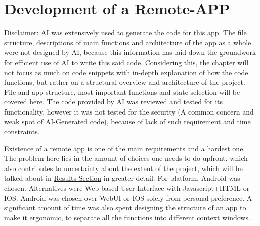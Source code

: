 \section{Development of a Remote-APP}\label{sec:FrontendDev}
Disclaimer: AI was extensively used to generate the code for this app. The file structure, descriptions of main functions and architecture of the app as a whole were not designed by AI, because this information has laid down the groundwork for efficient use of AI to write this said code. Considering this, the chapter will not focus as much on code snippets with in-depth explanation of how the code functions, but rather on a structural overview and architecture of the project. File and app structure, most important functions and state selection will be covered here. The code provided by AI was reviewed and tested for its functionality, however it was not tested for the security (A common concern and weak spot of AI-Generated code), because of lack of such requirement and time constraints.

Existence of a remote app is one of the main requirements and a hardest one. The problem here lies in the amount of choices one needs to do upfront, which also contributes to uncertainty about the extent of the project, which will be talked about in \hyperref[sec:discussion]{Results Section} in greater detail. For platform, Android was chosen. Alternatives were Web-based User Interface with Javascript+HTML or IOS. Android was chosen over WebUI or IOS solely from personal preference. A significant amount of time was also spent designing the structure of an app to make it ergonomic, to separate all the functions into different context windows.

